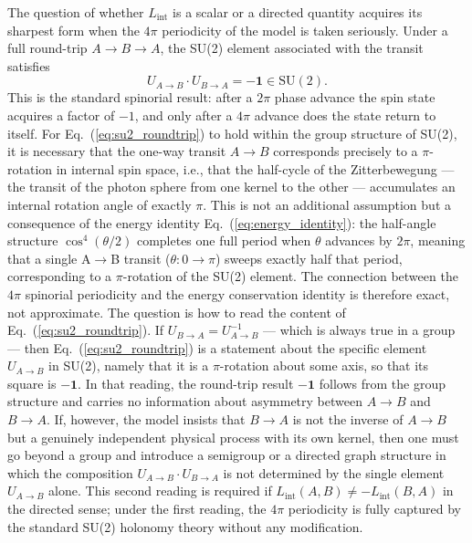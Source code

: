 \documentclass[%
 reprint,
 amsmath,amssymb,
 aps,
 prb,
]{revtex4-2}
\numberwithin{equation}{section}
\newcommand{\iphase}{\theta}  %
\newcommand{\Lint}{L_{\text{int}}}
\begin{document}
The question of whether $\Lint$ is a scalar or a directed quantity acquires its sharpest form when the $4\pi$ periodicity of the model is taken seriously. Under a full round-trip $A\to B\to A$, the SU(2) element associated with the transit satisfies
\begin{equation}
U_{A\to B}\cdot U_{B\to A} = -\mathbf{1} \in \mathrm{SU}(2).
\label{eq:su2_roundtrip}
\end{equation}
This is the standard spinorial result: after a $2\pi$ phase advance the spin state acquires a factor of $-1$, and only after a $4\pi$ advance does the state return to itself. For Eq.~(\ref{eq:su2_roundtrip}) to hold within the group structure of SU(2), it is necessary that the one-way transit $A\to B$ corresponds precisely to a $\pi$-rotation in internal spin space, i.e., that the half-cycle of the Zitterbewegung --- the transit of the photon sphere from one kernel to the other --- accumulates an internal rotation angle of exactly $\pi$. This is not an additional assumption but a consequence of the energy identity Eq.~(\ref{eq:energy_identity}): the half-angle structure $\cos^4(\iphase/2)$ completes one full period when $\iphase$ advances by $2\pi$, meaning that a single A$\to$B transit ($\iphase\colon 0\to\pi$) sweeps exactly half that period, corresponding to a $\pi$-rotation of the SU(2) element. The connection between the $4\pi$ spinorial periodicity and the energy conservation identity is therefore exact, not approximate. The question is how to read the content of Eq.~(\ref{eq:su2_roundtrip}). If $U_{B\to A} = U_{A\to B}^{-1}$ --- which is always true in a group --- then Eq.~(\ref{eq:su2_roundtrip}) is a statement about the specific element $U_{A\to B}$ in SU(2), namely that it is a $\pi$-rotation about some axis, so that its square is $-\mathbf{1}$. In that reading, the round-trip result $-\mathbf{1}$ follows from the group structure and carries no information about asymmetry between $A\to B$ and $B\to A$. If, however, the model insists that $B\to A$ is not the inverse of $A\to B$ but a genuinely independent physical process with its own kernel, then one must go beyond a group and introduce a semigroup or a directed graph structure in which the composition $U_{A\to B}\cdot U_{B\to A}$ is not determined by the single element $U_{A\to B}$ alone. This second reading is required if $\Lint(A,B) \neq -\Lint(B,A)$ in the directed sense; under the first reading, the $4\pi$ periodicity is fully captured by the standard SU(2) holonomy theory without any modification.
\end{document}

